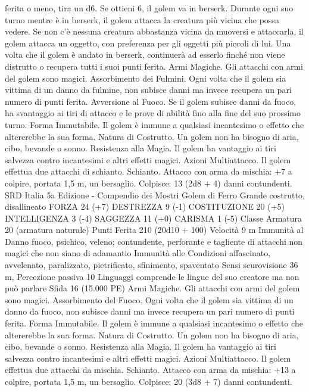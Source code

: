\begin{multicols}{2}
ferita o meno, tira un d6. Se ottieni 6, il golem va in berserk.
Durante ogni suo turno mentre è in berserk, il golem attacca la
creatura più vicina che possa vedere. Se non c’è nessuna creatura
abbastanza vicina da muoversi e attaccarla, il golem attacca un
oggetto, con preferenza per gli oggetti più piccoli di lui. Una
volta che il golem è andato in berserk, continuerà ad esserlo
finché non viene distrutto o recupera tutti i suoi punti ferita.
Armi Magiche. Gli attacchi con armi del golem sono magici.
Assorbimento dei Fulmini. Ogni volta che il golem sia vittima di
un danno da fulmine, non subisce danni ma invece recupera un
pari numero di punti ferita.
Avversione al Fuoco. Se il golem subisce danni da fuoco, ha
svantaggio ai tiri di attacco e le prove di abilità fino alla fine del
suo prossimo turno.
Forma Immutabile. Il golem è immune a qualsiasi incantesimo o
effetto che altererebbe la sua forma.
Natura di Costrutto. Un golem non ha bisogno di aria, cibo,
bevande o sonno.
Resistenza alla Magia. Il golem ha vantaggio ai tiri salvezza
contro incantesimi e altri effetti magici.
Azioni
Multiattacco. Il golem effettua due attacchi di schianto.
Schianto. Attacco con arma da mischia: +7 a colpire, portata 1,5
m, un bersaglio.
Colpisce: 13 (2d8 + 4) danni contundenti.
SRD Italia 5a Edizione - Compendio dei Mostri
Golem di Ferro
Grande costrutto, disallineato
FORZA 24 (+7)
DESTREZZA 9 (-1)
COSTITUZIONE 20 (+5)
INTELLIGENZA 3 (-4)
SAGGEZZA 11 (+0)
CARISMA 1 (-5)
Classe Armatura 20 (armatura naturale)
Punti Ferita 210 (20d10 + 100)
Velocità 9 m
Immunità al Danno fuoco, psichico, veleno; contundente,
perforante e tagliente di attacchi non magici che non siano di
adamantio
Immunità alle Condizioni affascinato, avvelenato, paralizzato,
pietrificato, sfinimento, spaventato
Sensi scurovisione 36 m, Percezione passiva 10
Linguaggi comprende le lingue del suo creatore ma non può
parlare
Sfida 16 (15.000 PE)
Armi Magiche. Gli attacchi con armi del golem sono magici.
Assorbimento del Fuoco. Ogni volta che il golem sia vittima di
un danno da fuoco, non subisce danni ma invece recupera un pari
numero di punti ferita.
Forma Immutabile. Il golem è immune a qualsiasi incantesimo o
effetto che altererebbe la sua forma.
Natura di Costrutto. Un golem non ha bisogno di aria, cibo,
bevande o sonno.
Resistenza alla Magia. Il golem ha vantaggio ai tiri salvezza
contro incantesimi e altri effetti magici.
Azioni
Multiattacco. Il golem effettua due attacchi da mischia.
Schianto. Attacco con arma da mischia: +13 a colpire, portata
1,5 m, un bersaglio.
Colpisce: 20 (3d8 + 7) danni contundenti.

\end{multicols}
